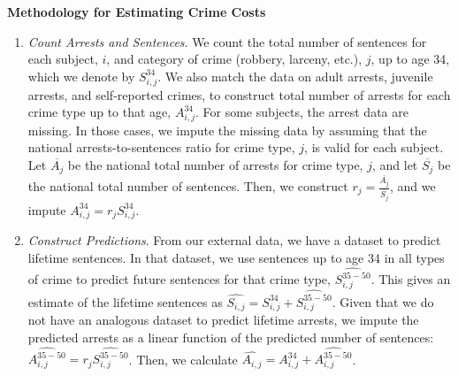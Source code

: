 \documentclass[static]{JJH-Beamer}
\begin{document}
\clearpage
\begin{frame}

\begin{center}
\textbf{Methodology for Estimating Crime Costs}
\end{center}

\end{frame}

\begin{frame}

\begin{enumerate}
\item \emph{Count Arrests and Sentences}. We count the total number of sentences for each subject, $i$, and category of crime (robbery, larceny, etc.), $j$, up to age 34,  which we denote by $S_{i,j}^{34}$. We also match the data on adult arrests, juvenile arrests, and self-reported crimes, to construct total number of  arrests for each crime type up to that age, $A_{i,j}^{34}$. For some subjects, the arrest data are missing. In those cases, we impute the missing data by assuming that the national arrests-to-sentences ratio for crime type, $j$, is valid for each subject. Let $\overline{A_j}$ be the national total number of arrests for crime type, $j$, and let $\overline{S_j}$ be the national total number of sentences. Then, we construct $r_j=\frac{\overline{A_j}}{\overline{S_j}}$, and we impute $A_{i,j}^{34}=r_j S_{i,j}^{34}$.
\end{enumerate}

\end{frame}

\begin{frame}

\begin{enumerate}
\setcounter{enumi}{1}
\item \emph{Construct Predictions}. From our external data, we have a dataset to predict lifetime sentences. In that dataset, we use sentences up to age 34 in all types of crime to predict future sentences for that crime type, $\widehat{S_{i,j}^{35-50}}$. This gives an estimate of the lifetime sentences as $\widehat{S_{i,j}}=S_{i,j}^{34}+\widehat{S_{i,j}^{35-50}}$. Given that we do not have an analogous dataset to predict lifetime arrests, we impute the predicted arrests as a linear function of the predicted number of sentences: $\widehat{A_{i,j}^{35-50}}=r_j \widehat{S_{i,j}^{35-50}}$. Then, we calculate $\widehat{A_{i,j}}=A_{i,j}^{34}+\widehat{A_{i,j}^{35-50}}$.
\end{enumerate}

\end{frame}
\end{document}
